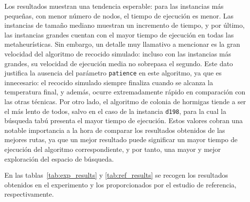 Los resultados muestran una tendencia esperable: para las instancias más pequeñas, con menor número de nodos, el tiempo de
ejecución es menor. Las instancias de tamaño mediano muestran un incremento de tiempo, y por último, las instancias grandes
cuentan con el mayor tiempo de ejecución en todas las metaheurísticas. Sin embargo, un detalle muy llamativo a mencionar es 
la gran velocidad del algoritmo de recocido simulado: incluso con las instancias más grandes, su velocidad de ejecución media no
sobrepasa el segundo. Este dato justifica la ausencia del parámetro \texttt{patience} en este algoritmo, ya que es innecesario: 
el recocido simulado siempre finaliza cuando se alcanza la temperatura final, y además, ocurre extremadamente rápido en 
comparación con las otras técnicas. Por otro lado, el algoritmo de colonia de hormigas tiende a ser el más lento de todos, salvo
en el caso de la instancia \texttt{d198}, para la cual la búsqueda tabú presenta el mayor tiempo de ejecución. Estos valores 
cobran una notable importancia a la hora de comparar los resultados obtenidos de las mejores rutas, ya que un mejor resultado 
puede significar un mayor tiempo de ejecución del algoritmo correspondiente, y por tanto, una mayor y mejor exploración del 
espacio de búsqueda.

En las tablas~\ref{tab:exp_results} y \ref{tab:ref_results} se recogen los resultados obtenidos en el experimento y los 
proporcionados por el estudio de referencia, respectivamente.


